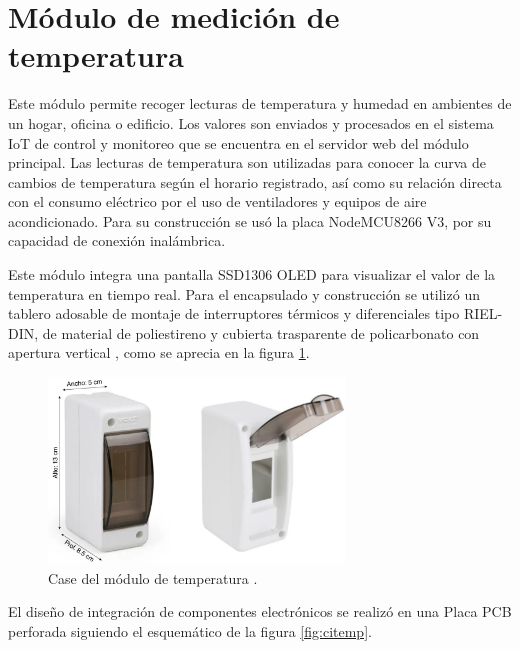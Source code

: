 \section{Módulo de medición de temperatura}

Este módulo permite recoger lecturas de temperatura y humedad en ambientes de un hogar, oficina o edificio. Los valores son enviados y procesados en el sistema IoT de control y monitoreo que se encuentra en el servidor web del módulo principal. Las lecturas de temperatura son utilizadas para conocer la curva de cambios de temperatura según el horario registrado, así como su relación directa con el consumo eléctrico por el uso de ventiladores y equipos de aire acondicionado. Para su construcción se usó la placa NodeMCU8266 V3, por su capacidad de conexión inalámbrica. 

Este módulo integra una pantalla SSD1306 OLED para visualizar el valor de la temperatura en tiempo real. Para el encapsulado y construcción se utilizó un tablero adosable de montaje de interruptores térmicos y diferenciales tipo RIEL-DIN, de material de poliestireno y cubierta trasparente de policarbonato con apertura vertical \citep{WEBSITE:17}, como se aprecia en la figura \ref{fig:casetemp}.


\begin{figure}[htpb]
\centering 
\includegraphics[width=0.7\textwidth]{./Figures/casetemp.png}
\caption{Case del módulo de temperatura \protect\footnotemark.}
\label{fig:casetemp}
\end{figure}


El diseño de integración de componentes electrónicos se realizó en una Placa PCB perforada siguiendo el esquemático de la figura \ref{fig:citemp}.

